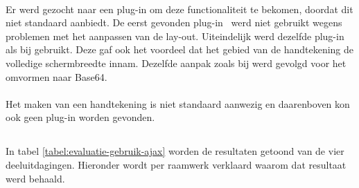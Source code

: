 \paragraph{\jqm}
Er werd gezocht naar een plug-in om deze functionaliteit te bekomen, doordat \jqm{} dit niet standaard aanbiedt. 
De eerst gevonden plug-in~\cite{Bradley2013} werd niet gebruikt wegens problemen met het aanpassen van de lay-out.
Uiteindelijk werd dezelfde plug-in als bij \kendo{} gebruikt.
Deze gaf ook het voordeel dat het gebied van de handtekening de volledige schermbreedte innam. 
Dezelfde aanpak zoals bij \kendo{} werd gevolgd voor het omvormen naar Base64.

\paragraph{\lungo}
Het maken van een handtekening is niet standaard aanwezig en daarenboven kon ook geen plug-in worden gevonden.


\subsection{}
\label{sec:evaluatie-gebruik-ajax}

In tabel \ref{tabel:evaluatie-gebruik-ajax} worden de resultaten getoond van de vier deeluitdagingen.
Hieronder wordt per raamwerk verklaard waarom dat resultaat werd behaald.

\begin{table}
\centering
{}
\caption{Gebruik van .}
\label{tabel:evaluatie-gebruik-ajax}
\end{table}


